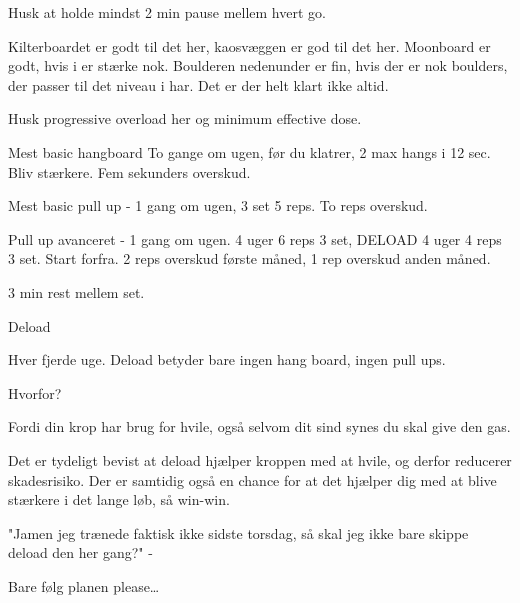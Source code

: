 \begin{multicols}{2}
Husk at holde mindst 2 min pause mellem hvert go.

Kilterboardet er godt til det her, kaosvæggen er god til det her. Moonboard er godt, hvis i er stærke nok. Boulderen nedenunder er fin, hvis der er nok boulders, der passer til det niveau i har. Det er der helt klart ikke altid.

Husk progressive overload her og minimum effective dose.

Mest basic hangboard To gange om ugen, før du klatrer, 2 max hangs i 12 sec. Bliv stærkere. Fem sekunders overskud.

Mest basic pull up - 1 gang om ugen, 3 set 5 reps. To reps overskud.

Pull up avanceret - 1 gang om ugen. 4 uger 6 reps 3 set, DELOAD 4 uger 4 reps 3 set. Start forfra. 2 reps overskud første måned, 1 rep overskud anden måned.

3 min rest mellem set.

\begin{tList}{Deload}

\item Hver fjerde uge. Deload betyder bare ingen hang board, ingen pull ups.

\item Hvorfor?
\item Fordi din krop har brug for hvile, også selvom dit sind synes du skal give den gas.

\item Det er tydeligt bevist at deload hjælper kroppen med at hvile, og derfor reducerer skadesrisiko. Der er samtidig også en chance for at det hjælper dig med at blive stærkere i det lange løb, så win-win.

\item "Jamen jeg trænede faktisk ikke sidste torsdag, så skal jeg ikke bare skippe deload den her gang?"
-

\end{tList}

Bare følg planen please…



\end{multicols}
